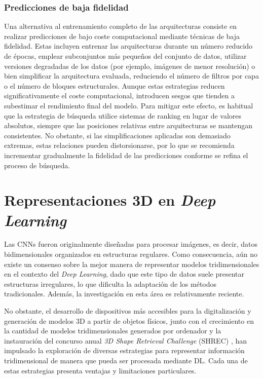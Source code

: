 \subsubsection{Predicciones de baja fidelidad}
Una alternativa al entrenamiento completo de las arquitecturas consiste en realizar predicciones de bajo coste computacional mediante técnicas de baja fidelidad. Estas incluyen entrenar las arquitecturas durante un número reducido de épocas, emplear subconjuntos más pequeños del conjunto de datos, utilizar versiones degradadas de los datos (por ejemplo, imágenes de menor resolución) o bien simplificar la arquitectura evaluada, reduciendo el número de filtros por capa o el número de bloques estructurales. Aunque estas estrategias reducen significativamente el coste computacional, introducen sesgos que tienden a subestimar el rendimiento final del modelo. Para mitigar este efecto, es habitual que la estrategia de búsqueda utilice sistemas de ranking en lugar de valores absolutos, siempre que las posiciones relativas entre arquitecturas se mantengan consistentes. No obstante, si las simplificaciones aplicadas son demasiado extremas, estas relaciones pueden distorsionarse, por lo que se recomienda incrementar gradualmente la fidelidad de las predicciones conforme se refina el proceso de búsqueda.

\section{Representaciones 3D en \textit{Deep Learning}}
\label{section2:3dreps}
Las CNNs fueron originalmente diseñadas para procesar imágenes, es decir, datos bidimensionales organizados en estructuras regulares. Como consecuencia, aún no existe un consenso sobre la mejor manera de representar modelos tridimensionales en el contexto del \textit{Deep Learning}, dado que este tipo de datos suele presentar estructuras irregulares, lo que dificulta la adaptación de los métodos tradicionales. Además, la investigación en esta área es relativamente reciente.

No obstante, el desarrollo de dispositivos más accesibles para la digitalización y generación de modelos 3D a partir de objetos físicos, junto con el crecimiento en la cantidad de modelos tridimensionales generados por ordenador y la instauración del concurso anual \textit{3D Shape Retrieval Challenge} (SHREC) \cite{noauthor_shrec_nodate, noauthor_3dor2024_nodate}, han impulsado la exploración de diversas estrategias para representar información tridimensional de manera que pueda ser procesada mediante DL. Cada una de estas estrategias presenta ventajas y limitaciones particulares.

